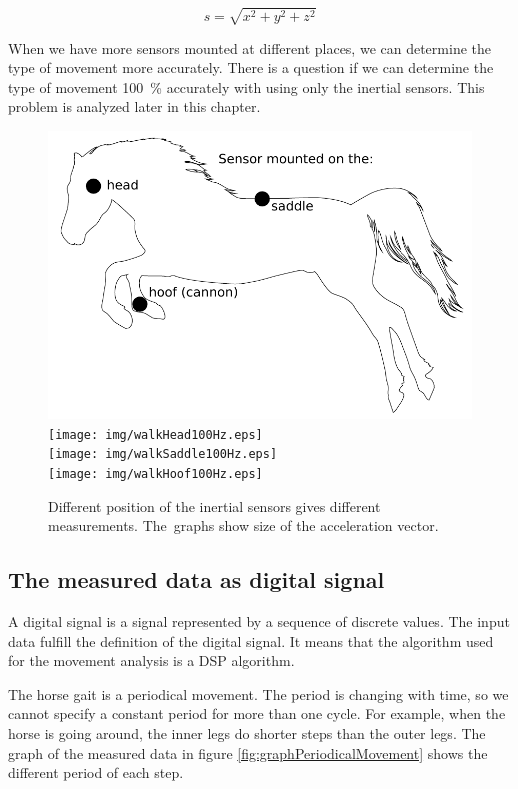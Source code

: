 $$ s = \sqrt{x^{2}+y^{2}+z^{2}} $$

When we have more sensors mounted at different places, we can determine the type of movement more accurately. There is a question if we can determine the type of movement \SI{100}{\%} accurately with using only the inertial sensors. This problem is analyzed later in this chapter.

\begin{figure}
    \centering
    \caption{Different position of the inertial sensors gives different measurements. The~graphs show size of the acceleration vector.}
    \label{fig:differentSensorPosition}
    \includegraphics[scale=0.5]{img/sensorMount.pdf} \\
    \texttt{[image: img/walkHead100Hz.eps]} \\
    \texttt{[image: img/walkSaddle100Hz.eps]} \\
    \texttt{[image: img/walkHoof100Hz.eps]}
\end{figure}

\subsection{The measured data as digital signal}
A digital signal is a signal represented by a sequence of discrete values. \cite{DigitalSignalProcessing} The input data fulfill the definition of the digital signal. It means that the algorithm used for the movement analysis is a \ac{DSP} algorithm.

The horse gait is a periodical movement. The period is changing with time, so we cannot specify a constant period for more than one cycle. For example, when the horse is going around, the inner legs do shorter steps than the outer legs. The graph of the measured data in figure \ref{fig:graphPeriodicalMovement} shows the different period of each step.

